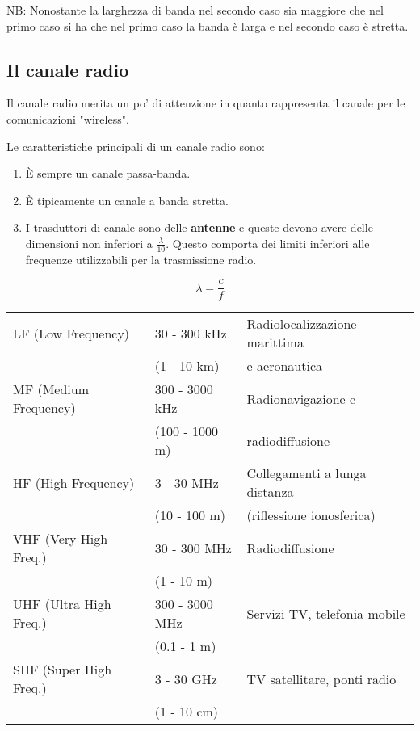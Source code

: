 NB: Nonostante la larghezza di banda nel secondo caso sia maggiore che nel primo caso si ha che nel primo caso la banda è larga e nel secondo caso è stretta.

\subsection*{Il canale radio}
Il canale radio merita un po' di attenzione in quanto rappresenta il canale per le comunicazioni "wireless".



Le caratteristiche principali di un canale radio sono:
\begin{enumerate}
    \item È sempre un canale passa-banda.
    \item È tipicamente un canale a banda stretta.
    \item I trasduttori di canale sono delle \textbf{antenne} e queste devono avere delle dimensioni non inferiori a $\frac{\lambda}{10}$. Questo comporta dei limiti inferiori alle frequenze utilizzabili per la trasmissione radio.
\end{enumerate}

\[
    \lambda = \frac{c}{f}
\]

\begin{tabular}{lll}
    LF (Low Frequency)     & 30 - 300 kHz   & Radiolocalizzazione marittima \\
                           & (1 - 10 km)    & e aeronautica                 \\
    MF (Medium Frequency)  & 300 - 3000 kHz & Radionavigazione e            \\
                           & (100 - 1000 m) & radiodiffusione               \\
    HF (High Frequency)    & 3 - 30 MHz     & Collegamenti a lunga distanza \\
                           & (10 - 100 m)   & (riflessione ionosferica)     \\
    VHF (Very High Freq.)  & 30 - 300 MHz   & Radiodiffusione               \\
                           & (1 - 10 m)     &                               \\
    UHF (Ultra High Freq.) & 300 - 3000 MHz & Servizi TV, telefonia mobile  \\
                           & (0.1 - 1 m)    &                               \\
    SHF (Super High Freq.) & 3 - 30 GHz     & TV satellitare, ponti radio   \\
                           & (1 - 10 cm)    &                               \\
\end{tabular}

